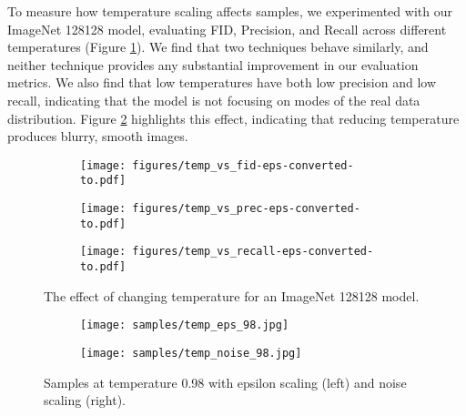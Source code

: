 \documentclass{article}
\begin{document}
To measure how temperature scaling affects samples, we experimented with our ImageNet 128128 model, evaluating FID, Precision, and Recall across different temperatures (Figure \ref{fig:tempchanging}). We find that two techniques behave similarly, and neither technique provides any substantial improvement in our evaluation metrics. We also find that low temperatures have both low precision and low recall, indicating that the model is not focusing on modes of the real data distribution. Figure \ref{fig:lowtempsamples} highlights this effect, indicating that reducing temperature produces blurry, smooth images.

\begin{figure}[h]
    \begin{center}
    \begin{subfigure}{0.32\textwidth}
        \centerline{\texttt{[image: figures/temp\_vs\_fid-eps-converted-to.pdf]}}
    \end{subfigure}
    \begin{subfigure}{0.32\textwidth}
        \centerline{\texttt{[image: figures/temp\_vs\_prec-eps-converted-to.pdf]}}
    \end{subfigure}
    \begin{subfigure}{0.32\textwidth}
        \centerline{\texttt{[image: figures/temp\_vs\_recall-eps-converted-to.pdf]}}
    \end{subfigure}
    \end{center}
    \caption{The effect of changing temperature for an ImageNet 128128 model.} 
    \label{fig:tempchanging}
\end{figure}

\begin{figure}[h]
    \begin{center}
    \begin{subfigure}{0.45\textwidth}
        \centerline{\texttt{[image: samples/temp\_eps\_98.jpg]}}
    \end{subfigure}
    \hspace{0.05\textwidth}
    \begin{subfigure}{0.45\textwidth}
        \centerline{\texttt{[image: samples/temp\_noise\_98.jpg]}}
    \end{subfigure}
    \end{center}
    \caption{Samples at temperature 0.98 with epsilon scaling (left) and noise scaling (right).} 
    \label{fig:lowtempsamples}
\end{figure}
\end{document}
